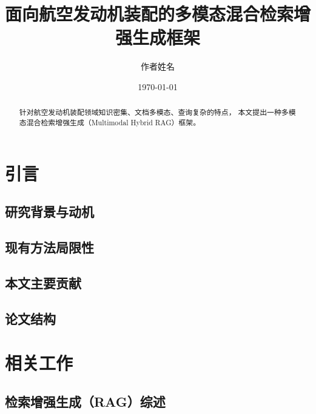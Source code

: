 \documentclass[12pt, a4paper]{article}
\title{\textbf{面向航空发动机装配的多模态混合检索增强生成框架}}
\author{作者姓名}
\date{\today}
\begin{document}
\maketitle

\begin{abstract}
针对航空发动机装配领域知识密集、文档多模态、查询复杂的特点，
本文提出一种多模态混合检索增强生成（Multimodal Hybrid RAG）框架。
\end{abstract}

\newpage
\tableofcontents
\newpage

\section{引言}

\subsection{研究背景与动机}

\subsection{现有方法局限性}

\subsection{本文主要贡献}

\subsection{论文结构}



\section{相关工作}

\subsection{检索增强生成（RAG）综述}
\end{document}

